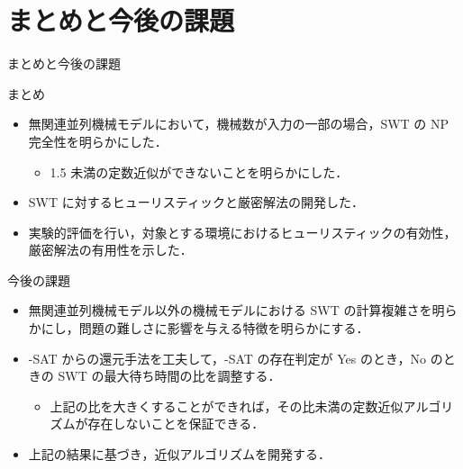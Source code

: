 \documentclass[dvipdfmx]{beamer}
\begin{document}
    \section{まとめと今後の課題}
    \begin{frame}{まとめと今後の課題}
      \begin{block}{まとめ}
        \begin{itemize}
          \item 無関連並列機械モデルにおいて，機械数が入力の一部の場合，SWT の NP 完全性を明らかにした．
          \begin{itemize}
            \item 1.5 未満の定数近似ができないことを明らかにした．
          \end{itemize}
          \item SWT に対するヒューリスティックと厳密解法の開発した．
          \item 実験的評価を行い，対象とする環境におけるヒューリスティックの有効性，厳密解法の有用性を示した．
        \end{itemize}
      \end{block}
      \begin{alertblock}{今後の課題}
        \begin{itemize}
          \item 無関連並列機械モデル以外の機械モデルにおける SWT の計算複雑さを明らかにし，問題の難しさに影響を与える特徴を明らかにする．
          \item {-SAT} からの還元手法を工夫して，{-SAT} の存在判定が Yes のとき，No のときの SWT の最大待ち時間の比を調整する．
          \begin{itemize}
            \item 上記の比を大きくすることができれば，その比未満の定数近似アルゴリズムが存在しないことを保証できる．
          \end{itemize}
          \item 上記の結果に基づき，近似アルゴリズムを開発する．
        \end{itemize}
      \end{alertblock}
    \end{frame}
    \begin{frame}

    \end{frame}
\end{document}
